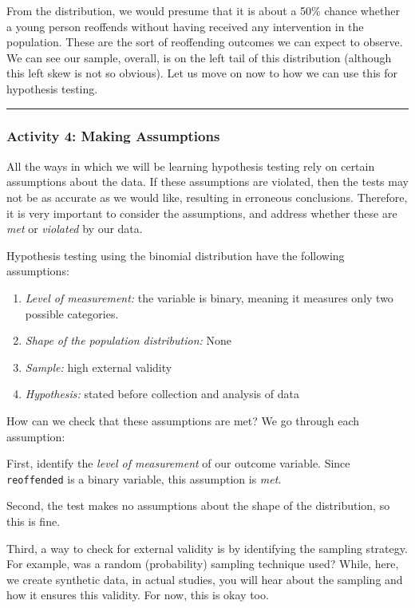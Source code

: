 \documentclass[
]{book}
\begin{document}
From the distribution, we would presume that it is about a 50\% chance whether a young person reoffends without having received any intervention in the population. These are the sort of reoffending outcomes we can expect to observe. We can see our sample, overall, is on the left tail of this distribution (although this left skew is not so obvious). Let us move on now to how we can use this for hypothesis testing.

\begin{center}\rule{0.5\linewidth}{0.5pt}\end{center}

\hypertarget{activity-4-making-assumptions}{%
\subsubsection{Activity 4: Making Assumptions}\label{activity-4-making-assumptions}}

All the ways in which we will be learning hypothesis testing rely on certain assumptions about the data. If these assumptions are violated, then the tests may not be as accurate as we would like, resulting in erroneous conclusions. Therefore, it is very important to consider the assumptions, and address whether these are \emph{met} or \emph{violated} by our data.

Hypothesis testing using the binomial distribution have the following assumptions:

\begin{enumerate}
\def\labelenumi{\arabic{enumi}.}
\item
  \emph{Level of measurement:} the variable is binary, meaning it measures only two possible categories.
\item
  \emph{Shape of the population distribution:} None
\item
  \emph{Sample:} high external validity
\item
  \emph{Hypothesis:} stated before collection and analysis of data
\end{enumerate}

How can we check that these assumptions are met? We go through each assumption:

First, identify the \emph{level of measurement} of our outcome variable. Since \texttt{reoffended} is a binary variable, this assumption is \emph{met}.

Second, the test makes no assumptions about the shape of the distribution, so this is fine.

Third, a way to check for external validity is by identifying the sampling strategy. For example, was a random (probability) sampling technique used? While, here, we create synthetic data, in actual studies, you will hear about the sampling and how it ensures this validity. For now, this is okay too.
\end{document}
